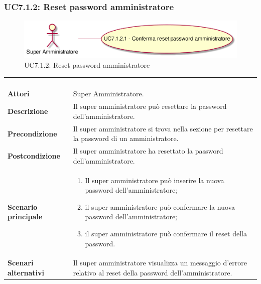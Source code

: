 \subsubsection{UC7.1.2: Reset password amministratore}
\label{UC7.1.2}
\begin{figure}[h]
\centering
\includegraphics[width=\textwidth,height=\textheight,keepaspectratio]{images/UseCaseUC712.png}
\caption{UC7.1.2: Reset password amministratore}
\end{figure}
\begin{longtable}{l|p{10cm}}
\rowcolor[gray]{0.8} \multicolumn{2}{c}{} \\
\rowcolor[gray]{0.8} \multicolumn{2}{c}{\textbf{UC7.1.2 - Reset password amministratore}} \\
\rowcolor[gray]{0.8} \multicolumn{2}{c}{} \\
\hline
&\\
\textbf{Attori} & Super Amministratore.\\[7pt]
\textbf{Descrizione} & Il super amministratore può resettare la password dell'amministratore.\\[7pt]
\textbf{Precondizione} & Il super amministratore si trova nella sezione per resettare la password di un amministratore.\\[7pt]
\textbf{Postcondizione} & Il super amministratore ha resettato la password dell'amministratore.\\[7pt]
\textbf{Scenario principale} &\begin{enumerate}
\item  Il super amministratore può inserire la nuova password dell'amministratore;
\item  il super amministratore può confermare la nuova password dell'amministratore;
\item  il super amministratore può confermare il reset della password.
\end{enumerate}
\\[7pt]
\textbf{Scenari alternativi} & Il super amministratore visualizza un messaggio d'errore relativo al reset della password dell'amministratore.\\[7pt]\hline
\end{longtable}

